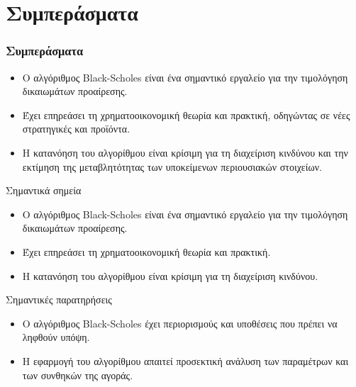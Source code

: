 \section{Συμπεράσματα}
\begin{frame}
  \frametitle{Συμπεράσματα}
  \begin{itemize}
    \item Ο αλγόριθμος Black-Scholes είναι ένα σημαντικό εργαλείο για την τιμολόγηση δικαιωμάτων προαίρεσης.
    \item Έχει επηρεάσει τη χρηματοοικονομική θεωρία και πρακτική, οδηγώντας σε νέες στρατηγικές και προϊόντα.
    \item Η κατανόηση του αλγορίθμου είναι κρίσιμη για τη διαχείριση κινδύνου και την εκτίμηση της μεταβλητότητας των υποκείμενων περιουσιακών στοιχείων.
  \end{itemize}
  \begin{block}{Σημαντικά σημεία}
    \begin{itemize}
      \item Ο αλγόριθμος Black-Scholes είναι ένα σημαντικό εργαλείο για την τιμολόγηση δικαιωμάτων προαίρεσης.
      \item Έχει επηρεάσει τη χρηματοοικονομική θεωρία και πρακτική.
      \item Η κατανόηση του αλγορίθμου είναι κρίσιμη για τη διαχείριση κινδύνου.
    \end{itemize}
  \end{block}
  \begin{block}{Σημαντικές παρατηρήσεις}
    \begin{itemize}
      \item Ο αλγόριθμος Black-Scholes έχει περιορισμούς και υποθέσεις που πρέπει να ληφθούν υπόψη.
      \item Η εφαρμογή του αλγορίθμου απαιτεί προσεκτική ανάλυση των παραμέτρων και των συνθηκών της αγοράς.
    \end{itemize}
  \end{block}
\end{frame}
